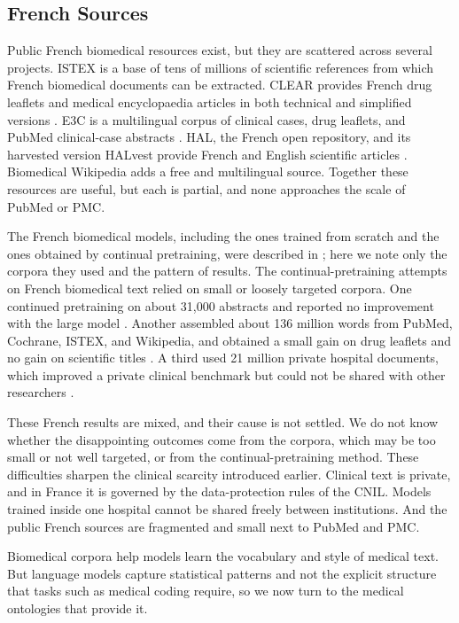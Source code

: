 \subsection{French Sources}

Public French biomedical resources exist, but they are scattered across several projects.
ISTEX is a base of tens of millions of scientific references from which French biomedical
documents can be extracted. CLEAR provides French drug leaflets and medical encyclopaedia
articles in both technical and simplified versions \citep{grabar_clear_2018}. E3C is a
multilingual corpus of clinical cases, drug leaflets, and PubMed clinical-case abstracts
\citep{magnini_e3c_2021}. HAL, the French open repository, and its harvested version HALvest
provide French and English scientific articles \citep{kulumba2024halvest}. Biomedical
Wikipedia adds a free and multilingual source. Together these resources are useful, but
each is partial, and none approaches the scale of PubMed or PMC.

The French biomedical models, including the ones trained from scratch and the ones obtained
by continual pretraining, were described in ; here we note only the
corpora they used and the pattern of results. The continual-pretraining attempts on French
biomedical text relied on small or loosely targeted corpora. One continued pretraining on about 31{,}000 abstracts
and reported no improvement with the large model \citep{copara_contextualized_2020}. Another assembled about 136
million words from PubMed, Cochrane, ISTEX, and Wikipedia, and obtained a small gain on drug
leaflets and no gain on scientific titles \citep{le_clercq_de_lannoy_strategies_2022}. A
third used 21 million private hospital documents, which improved a private clinical benchmark
but could not be shared with other researchers \citep{dura_learning_2022}.

These French results are mixed, and their cause is not settled. We do not know whether the
disappointing outcomes come from the corpora, which may be too small or not well targeted, or
from the continual-pretraining method. These difficulties sharpen the clinical scarcity
introduced earlier. Clinical text is private, and in France it is governed by the data-protection
rules of the CNIL. Models trained inside one hospital cannot be shared freely between institutions.
And the public French sources are fragmented and small next to PubMed and PMC.

Biomedical corpora help models learn the vocabulary and style of medical text. But language
models capture statistical patterns and not the explicit structure that tasks such as medical
coding require, so we now turn to the medical ontologies that provide it.
